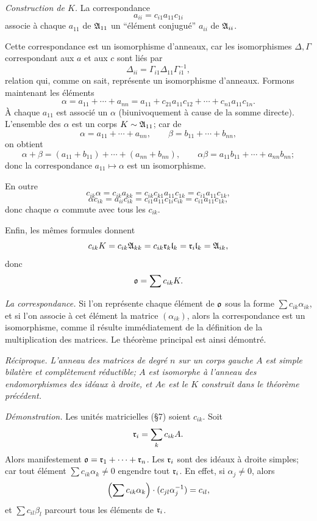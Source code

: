 \emph{Construction de $K$.} La correspondance
\[
        a_{ii}=c_{i1}a_{11}c_{1i}
\]
associe à chaque $a_{11}$ de $\mathfrak{A}_{11}$ un ``élément conjugué'' $a_{ii}$ de $\mathfrak{A}_{ii}$.

Cette correspondance est un isomorphisme d'anneaux, car les isomorphismes $\Delta,\Gamma$ correspondant aux $a$ et aux $c$ sont liés par
\[
        \Delta_{ii}=\Gamma_{i1}\Delta_{11}\Gamma_{i1}^{-1},
\]
relation qui, comme on sait, représente un isomorphisme d'anneaux. Formons maintenant les éléments
\[
        \alpha=a_{11}+\cdots+a_{nn}=a_{11}+c_{21}a_{11}c_{12}+\cdots+c_{n1}a_{11}c_{1n}.
\]
À chaque $a_{11}$ est associé un $\alpha$ (biunivoquement à cause de la somme directe). L'ensemble des $\alpha$ est un corps $K\sim\mathfrak{A}_{11}$; car de
\[
        \alpha=a_{11}+\cdots+a_{nn},
        \qquad
        \beta=b_{11}+\cdots+b_{nn},
\]
on obtient
\[
        \alpha+\beta=(a_{11}+b_{11})+\cdots+(a_{nn}+b_{nn}),
        \qquad
        \alpha\beta=a_{11}b_{11}+\cdots+a_{nn}b_{nn};
\]
donc la correspondance $a_{11}\mapsto\alpha$ est un isomorphisme.

En outre
\[
        c_{ik}\alpha=c_{ik}a_{kk}=c_{ik}c_{k1}a_{11}c_{1k}=c_{i1}a_{11}c_{1k},
\]
\[
        \alpha c_{ik}=a_{ii}c_{ik}=c_{i1}a_{11}c_{1i}c_{ik}=c_{i1}a_{11}c_{1k},
\]
donc chaque $\alpha$ commute avec tous les $c_{ik}$.

Enfin, les mêmes formules donnent
\[
        c_{ik}K=c_{ik}\mathfrak{A}_{kk}=c_{ik}\mathfrak{r}_k\mathfrak{l}_k=\mathfrak{r}_i\mathfrak{l}_k=\mathfrak{A}_{ik},
\]
donc
\[
        \mathfrak{o}=\sum c_{ik}K.
\]

\emph{La correspondance.} Si l'on représente chaque élément de $\mathfrak{o}$ sous la forme $\sum c_{ik}\alpha_{ik}$, et si l'on associe à cet élément la matrice $(\alpha_{ik})$, alors la correspondance est un isomorphisme, comme il résulte immédiatement de la définition de la multiplication des matrices. Le théorème principal est ainsi démontré.

\emph{Réciproque. L'anneau des matrices de degré $n$ sur un corps gauche $A$ est simple bilatère et complètement réductible; $A$ est isomorphe à l'anneau des endomorphismes des idéaux à droite, et $Ae$ est le $K$ construit dans le théorème précédent.}

\emph{Démonstration.} Les unités matricielles (\S{}7) soient $c_{ik}$. Soit
\[
        \mathfrak{r}_i=\sum_k c_{ik}A.
\]
Alors manifestement $\mathfrak{o}=\mathfrak{r}_1+\cdots+\mathfrak{r}_n$. Les $\mathfrak{r}_i$ sont des idéaux à droite simples; car tout élément $\sum c_{ik}\alpha_k\ne0$ engendre tout $\mathfrak{r}_i$. En effet, si $\alpha_j\ne0$, alors
\[
        \Bigl(\sum c_{ik}\alpha_k\Bigr)\cdot(c_{jl}\alpha_j^{-1})=c_{il},
\]
et $\sum c_{il}\beta_l$ parcourt tous les éléments de $\mathfrak{r}_i$.

